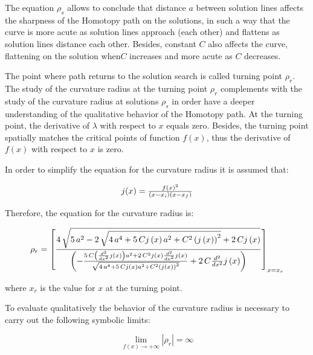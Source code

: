 \documentclass[conference,letterpaper,onecolumn]{IEEEtran}
\begin{document}
{The equation $\rho_{s}$ allows to conclude that distance $a$ between solution lines affects the sharpness of the Homotopy path on the solutions, in such a way that the curve is more acute as solution lines approach (each other) and flattens as solution lines distance each other. Besides, constant $C$ also affects the curve, flattening on the solution when$C$ increases and more acute as $C$ decreases.

The point where path returns to the solution search is called turning point $\rho_r$. The study of the curvature radius at the turning point $\rho_r$ complements with the study of the curvature radius at solutions $\rho_s$ in order have a deeper understanding of the qualitative behavior of the Homotopy path. At the turning point, the derivative of $\lambda$ with respect to $x$ equals zero. Besides, the turning point spatially matches the critical points of function $f(x)$, thus the derivative of $f(x)$ with respect to $x$ is zero.

In order to simplify the equation for the curvature radius it is assumed that:

\begin{displaymath}
\begin{array}{l}
 j(x)= {f(x)^2 \over (x-x_i)(x-x_f)}
\end{array}
\end{displaymath}

Therefore, the equation for the curvature radius is:

{
\begin{displaymath}
\rho_{r}=\left[{4\,\sqrt {5\,{a}^{2}- 2\,\sqrt {4\,{a}^{4}+ 5\,Cj \left( x
 \right) {a}^{2}+{C}^{2} \left( j \left( x \right)  \right) ^{2}}+ 2
\,Cj \left( x \right) } \over \left( -{\frac {5\,C \left( {\frac {d^{2}}{d{x
}^{2}}}j \left( x \right)  \right) {a}^{2}+2\,{C}^{2}j \left( x
 \right) {\frac {d^{2}}{d{x}^{2}}}j \left( x \right) }{\sqrt {4\,{a}^{
4}+5\,Cj \left( x \right) {a}^{2}+{C}^{2} \left( j \left( x \right) 
 \right) ^{2}}}}+2\,C{\frac {d^{2}}{d{x}^{2}}}j \left( x \right) 
 \right)} \right]_{x=x_r}
\end{displaymath}
}

where $x_r$ is the value for $x$ at the turning point.

To evaluate qualitatively the behavior of the curvature radius is necessary to carry out the following symbolic limits:

\begin{equation}
 \displaystyle\lim_{f(x) \to{+}\infty}{|\rho_{r}|}=\infty
 \label{rcurv1}
\end{equation}

}
\end{document}

